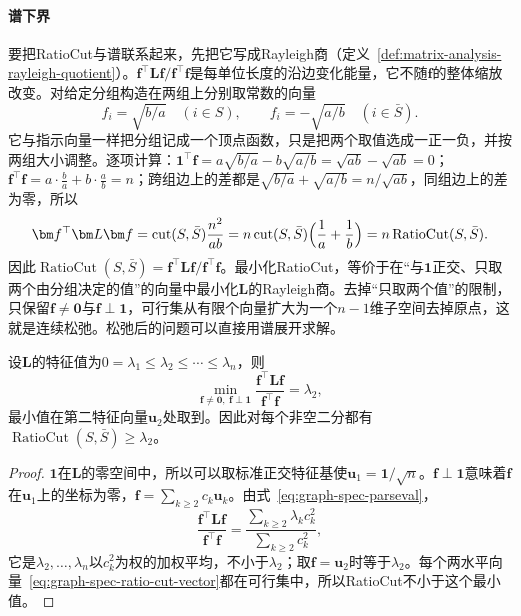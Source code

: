 \paragraph{谱下界}
要把RatioCut与谱联系起来，先把它写成Rayleigh商（定义~\ref{def:matrix-analysis-rayleigh-quotient}）。$\bm f^{\top}\bm L\bm f/\bm f^{\top}\bm f$是每单位长度的沿边变化能量，它不随$\bm f$的整体缩放改变。对给定分组构造在两组上分别取常数的向量
\begin{equation}
 f_i=\sqrt{b/a}\quad(i\in S),\qquad f_i=-\sqrt{a/b}\quad(i\in\bar S).
 \label{eq:graph-spec-ratio-cut-vector}
\end{equation}
它与指示向量一样把分组记成一个顶点函数，只是把两个取值选成一正一负，并按两组大小调整。逐项计算：$\bm1^{\top}\bm f=a\sqrt{b/a}-b\sqrt{a/b}=\sqrt{ab}-\sqrt{ab}=0$；$\bm f^{\top}\bm f=a\cdot\tfrac ba+b\cdot\tfrac ab=n$；跨组边上的差都是$\sqrt{b/a}+\sqrt{a/b}=n/\sqrt{ab}$，同组边上的差为零，所以
\[
 \bm f^{\top}\bm L\bm f=\operatorname{cut}(S,\bar S)\frac{n^2}{ab}=n\operatorname{cut}(S,\bar S)\Bigl(\frac1a+\frac1b\Bigr)=n\operatorname{RatioCut}(S,\bar S).
\]
因此$\operatorname{RatioCut}(S,\bar S)=\bm f^{\top}\bm L\bm f/\bm f^{\top}\bm f$。最小化RatioCut，等价于在“与$\bm1$正交、只取两个由分组决定的值”的向量中最小化$\bm L$的Rayleigh商。去掉“只取两个值”的限制，只保留$\bm f\neq\bm0$与$\bm f\perp\bm1$，可行集从有限个向量扩大为一个$n-1$维子空间去掉原点，这就是连续松弛。松弛后的问题可以直接用谱展开求解。

\begin{theorem}[RatioCut的谱下界]
\label{thm:graph-spec-ratio-cut-bound}
设$\bm L$的特征值为$0=\lambda_1\leq\lambda_2\leq\cdots\leq\lambda_n$，则
\[
 \min_{\bm f\neq\bm0,\ \bm f\perp\bm1}\frac{\bm f^{\top}\bm L\bm f}{\bm f^{\top}\bm f}=\lambda_2 ,
\]
最小值在第二特征向量$\bm u_2$处取到。因此对每个非空二分都有$\operatorname{RatioCut}(S,\bar S)\geq\lambda_2$。
\end{theorem}

\begin{proof}
$\bm1$在$\bm L$的零空间中，所以可以取标准正交特征基使$\bm u_1=\bm1/\sqrt n$。$\bm f\perp\bm1$意味着$\bm f$在$\bm u_1$上的坐标为零，$\bm f=\sum_{k\geq2}c_k\bm u_k$。由式~\eqref{eq:graph-spec-parseval}，
\[
 \frac{\bm f^{\top}\bm L\bm f}{\bm f^{\top}\bm f}=\frac{\sum_{k\geq2}\lambda_kc_k^2}{\sum_{k\geq2}c_k^2},
\]
它是$\lambda_2,\ldots,\lambda_n$以$c_k^2$为权的加权平均，不小于$\lambda_2$；取$\bm f=\bm u_2$时等于$\lambda_2$。每个两水平向量~\eqref{eq:graph-spec-ratio-cut-vector}都在可行集中，所以RatioCut不小于这个最小值。
\end{proof}

